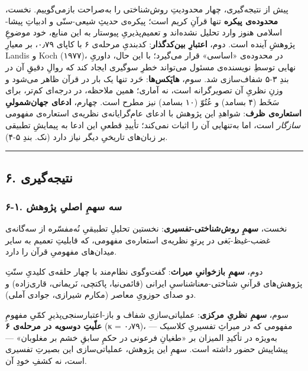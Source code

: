 \documentclass[12pt,a4paper]{article}
\begin{document}
\begin{RTL}
\begin{otherlanguage}{persian}
پیش از نتیجه‌گیری، چهار محدودیتِ روش‌شناختی را به‌صراحت بازمی‌گوییم. نخست،
\textbf{محدوده‌ی پیکره} تنها قرآنِ کریم است؛ پیکره‌ی حدیثِ شیعی-سنّی و ادبیاتِ
پیشا-اسلامی هنوز وارد تحلیل نشده‌اند و تعمیم‌پذیریِ پیوستار به این منابع،
خود موضوعِ پژوهشِ آینده است. دوم، \textbf{اعتبارِ بین‌کدگذار}: کدبندیِ مرحله‌ی
۶ با کاپای ۰٫۷۹، بر معیارِ Landis و Koch (۱۹۷۷)، در محدوده‌ی «اساسی» قرار
می‌گیرد؛ با این حال، داوریِ نهایی توسطِ نویسنده‌ی مسئول می‌تواند خطرِ سوگیری
ایجاد کند که روالِ دقیقِ آن در بندِ ۳-۵ شفاف‌سازی شد. سوم، \textbf{هاپَکس‌ها}:
حَرد تنها یک بار در قرآن ظاهر می‌شود و وزنِ نظریِ آن تصویرگرانه است، نه
آماری؛ همین ملاحظه، در درجه‌ای کم‌تر، برای سَخَط (۴ بسامد) و عُتُوّ (۱۰ بسامد)
نیز مطرح است. چهارم، \textbf{ادعای جهان‌شمولیِ استعاره‌ی ظرف}: شواهدِ این
پژوهش با ادعای عام‌گرایانه‌ی نظریه‌ی استعاره‌ی مفهومی \emph{سازگار} است، اما
به‌تنهایی آن را اثبات نمی‌کند؛ تأییدِ قطعیِ این ادعا به پیمایشِ تطبیقی بر
زبان‌های تاریخیِ دیگر نیاز دارد (نک. بندِ ۵-۴).

\begin{center}\rule{0.5\linewidth}{0.5pt}\end{center}

\subsection{۶.
نتیجه‌گیری}\label{ux646ux62aux6ccux62cux647ux6afux6ccux631ux6cc}

\subsubsection{۶-۱. سه سهمِ اصلیِ
پژوهش}\label{ux633ux647-ux633ux647ux645-ux627ux635ux644ux6cc-ux67eux698ux648ux647ux634}

نخست، \textbf{سهمِ روش‌شناختی-تفسیری}: نخستین تحلیلِ تطبیقیِ نُه‌مفسّره از
سه‌گانه‌ی غضب-غیظ-بَغی در پرتوِ نظریه‌ی استعاره‌ی مفهومی، که قابلیتِ تعمیم به
سایر میدان‌های مفهومیِ قرآن را دارد.

دوم، \textbf{سهمِ بازخوانیِ میراث}: گفت‌وگوی نظام‌مند با چهار حلقه‌ی کلیدیِ
سنّتِ پژوهش‌های قرآنیِ شناختی-معناشناسیِ ایرانی (قائمی‌نیا، پاکتچی، نَریمانی،
قاری‌زاده) و دو صدای حوزویِ معاصر (مکارم شیرازی، جوادی آملی).

سوم، \textbf{سهمِ نظریِ مرکزی}: عملیاتی‌سازیِ شفاف و باز-اعتبارسنجی‌پذیرِ کمّیِ
مفهومِ \textbf{علّیتِ دوسویه در مرحله‌ی ۶} (κ = ۰٫۷۹)، مفهومی که در میراثِ
تفسیریِ کلاسیک --- به‌ویژه در تأکیدِ المیزان بر «طغیانِ فرعونی در حکمِ سابقِ
خشم بر مغلوبان» --- پیشاپیش حضور داشته است. سهمِ این پژوهش، عملیاتی‌سازی
این بصیرتِ تفسیری است، نه کشفِ خودِ آن.


\end{otherlanguage}
\end{RTL}
\end{document}
